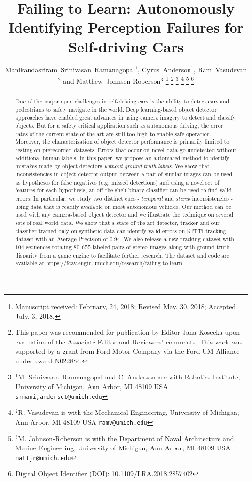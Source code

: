\documentclass[letterpaper, 10 pt, journal, twoside]{IEEEtran}  %
\title{Failing to Learn: Autonomously Identifying Perception Failures for Self-driving Cars}
\author{Manikandasriram~Srinivasan~Ramanagopal$^{1}$, Cyrus~Anderson$^{1}$, Ram~Vasudevan$^{2}$ and Matthew~Johnson-Roberson$^{3}$%
\thanks{Manuscript received: February, 24, 2018; Revised May, 30, 2018; Accepted July, 3, 2018.}%
\thanks{This paper was recommended for publication by Editor Jana Kosecka upon evaluation of the Associate Editor and Reviewers' comments. 
This work was supported by a grant from Ford Motor Company via the Ford-UM Alliance under award N022884.}%
\thanks{$^1$M. Srinivasan~Ramanagopal and C. Anderson are with Robotics Institute, University of Michigan, Ann Arbor, MI 48109 USA {\tt\footnotesize srmani,andersct@umich.edu}}%
\thanks{$^2$R. Vasudevan is with the Mechanical Engineering, University of Michigan, Ann Arbor, MI 48109 USA {\tt\footnotesize ramv@umich.edu}}%
\thanks{$^3$M. Johnson-Roberson is with the Department of Naval Architecture and Marine Engineering, University of Michigan, Ann Arbor, MI 48109 USA {\tt\footnotesize mattjr@umich.edu}}%
\thanks{Digital Object Identifier (DOI): 10.1109/LRA.2018.2857402}
}
\begin{document}
\maketitle


\begin{abstract}
One of the major open challenges in self-driving cars is the ability to detect cars and pedestrians to safely navigate in the world. 
Deep learning-based object detector approaches have enabled great advances in using camera imagery
to detect and classify objects. 
But for a safety critical application such as autonomous driving, the error rates of the current state-of-the-art are still too high to enable safe operation. 
Moreover, the characterization of object detector performance is primarily limited to testing on prerecorded datasets. 
Errors that occur on novel data go undetected without additional human labels. 
In this paper, we propose an automated method to identify mistakes made by object detectors \emph{without ground truth labels}. 
We show that inconsistencies in object detector output between a pair of similar images can be used as hypotheses for false negatives (e.g. missed detections)
and using a novel set of features for each hypothesis, an off-the-shelf binary classifier can be used to find valid errors.
In particular, we study two distinct cues - \emph{temporal} and \emph{stereo} inconsistencies - using data that is readily available on most autonomous vehicles.
Our method can be used with any camera-based object detector and we illustrate the technique on several sets of real world data. 
We show that a state-of-the-art detector, tracker and our classifier trained only on synthetic data can identify valid errors on KITTI tracking dataset with 
an Average Precision of $0.94$. We also release a new tracking dataset with $104$ sequences totaling $80,655$ labeled pairs of stereo images along with ground
truth disparity from a game engine to facilitate further research. The dataset and code are available at \url{https://fcav.engin.umich.edu/research/failing-to-learn}
\end{abstract}
\end{document}
